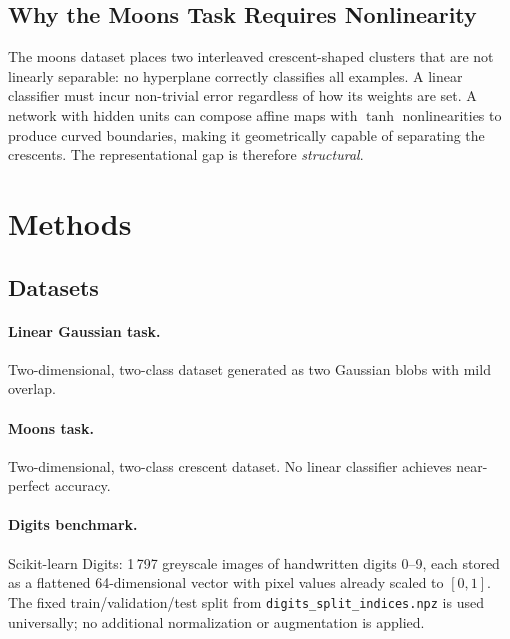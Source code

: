 \documentclass[11pt]{article}
\begin{document}
\subsection{Why the Moons Task Requires Nonlinearity}
\label{subsec:moons_geometry}

The moons dataset places two interleaved crescent-shaped clusters that are not
linearly separable: no hyperplane correctly classifies all examples.
A linear classifier must incur non-trivial error regardless of how its weights
are set.
A network with hidden units can compose affine maps with $\tanh$ nonlinearities
to produce curved boundaries, making it geometrically capable of separating
the crescents.
The representational gap is therefore \emph{structural}.

\section{Methods}
\label{sec:methods}

\subsection{Datasets}

\paragraph{Linear Gaussian task.}
Two-dimensional, two-class dataset generated as two Gaussian blobs with mild
overlap.

\paragraph{Moons task.}
Two-dimensional, two-class crescent dataset.
No linear classifier achieves near-perfect accuracy.

\paragraph{Digits benchmark.}
Scikit-learn Digits: 1\,797 greyscale images of handwritten digits 0--9, each
stored as a flattened 64-dimensional vector with pixel values already scaled
to $[0,1]$.
The fixed train/validation/test split from \texttt{digits\_split\_indices.npz}
is used universally; no additional normalization or augmentation is applied.
\end{document}
